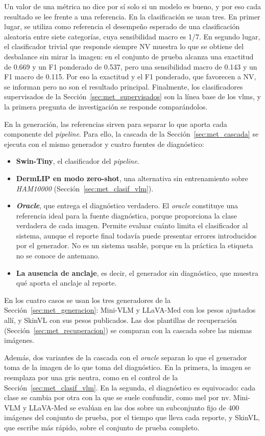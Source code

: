 Un valor de una métrica no dice por sí solo si un modelo es bueno, y por eso cada resultado se lee frente a una
referencia. En la clasificación se usan tres. En primer lugar, se utiliza como referencia el desempeño esperado de una clasificación aleatoria entre siete categorías, cuya sensibilidad macro es 1/7. En segundo lugar, el clasificador trivial que responde siempre NV muestra
lo que se obtiene del desbalance sin mirar la imagen: en el conjunto de prueba alcanza una exactitud de 0.669 y un F1 ponderado de
0.537, pero una sensibilidad macro de 0.143 y un F1 macro de 0.115. Por eso la exactitud y el F1 ponderado, que
favorecen a NV, se informan pero no son el resultado principal. Finalmente, los clasificadores supervisados de la
Sección~\ref{sec:met_supervisados} son la línea base de los \glspl{vlm}, y la primera pregunta de investigación se
responde comparándolos.

En la generación, las referencias sirven para separar lo que aporta cada componente del \emph{pipeline}. Para ello, la
cascada de la Sección~\ref{sec:met_cascada} se ejecuta con el mismo generador y cuatro fuentes de diagnóstico:
\begin{itemize}[leftmargin=1.6em]
    \item \textbf{Swin-Tiny}, el clasificador del \emph{pipeline}.
    \item \textbf{DermLIP en modo zero-shot}, una alternativa sin entrenamiento sobre \emph{HAM10000}
        (Sección~\ref{sec:met_clasif_vlm}).
    \item \textbf{\emph{Oracle}}, que entrega el diagnóstico verdadero. El \emph{oracle} constituye una referencia ideal para la fuente diagnóstica, porque proporciona la clase verdadera de cada imagen. Permite evaluar cuánto limita el clasificador al sistema, aunque el reporte final todavía puede presentar errores introducidos por el generador. No es un sistema usable, porque en la práctica la etiqueta no se conoce de antemano.
    \item \textbf{La ausencia de anclaje}, es decir, el generador sin diagnóstico, que muestra qué aporta el anclaje al
        reporte.
\end{itemize}
En los cuatro casos se usan los tres generadores de la Sección~\ref{sec:met_generacion}: Mini-VLM y LLaVA-Med con los
pesos ajustados allí, y SkinVL con sus pesos publicados. Las dos plantillas de recuperación
(Sección~\ref{sec:met_recuperacion}) se comparan con la cascada sobre las mismas imágenes.

Además, dos variantes de la cascada con el \emph{oracle} separan lo que el generador toma de la imagen de lo que toma
del diagnóstico. En la primera, la imagen se reemplaza por una gris neutra, como en el control de la
Sección~\ref{sec:met_clasif_vlm}. En la segunda, el diagnóstico es equivocado: cada clase se cambia por otra con la
que se suele confundir, como \gls{mel} por \gls{nv}. Mini-VLM y LLaVA-Med se evalúan en las dos sobre un subconjunto
fijo de 400 imágenes del conjunto de prueba, por el tiempo que lleva cada reporte, y SkinVL, que escribe más rápido, sobre el conjunto de prueba completo.

